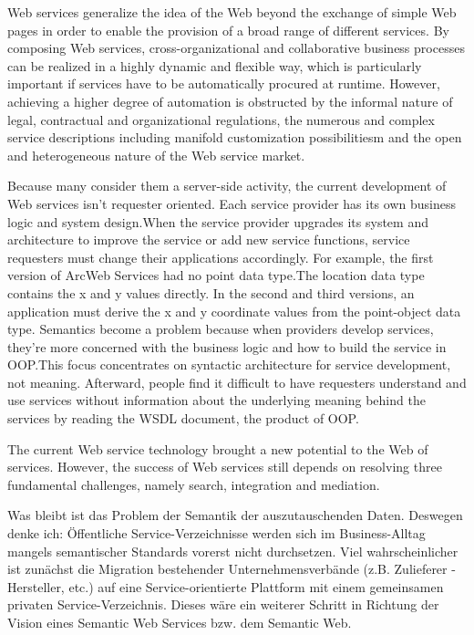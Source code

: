\documentclass[10pt,a4paper]{article}
\begin{document}
Web services generalize the idea of the Web beyond the exchange of simple Web pages in order to enable the provision of a broad range of different services. By composing Web services, cross-organizational and collaborative business processes can be realized in a highly dynamic and flexible way, which is particularly important if services have to be automatically procured at runtime. However, achieving a higher degree of automation is obstructed by the informal nature of legal, contractual and organizational regulations, the numerous and complex service descriptions including manifold customization possibilitiesm and the open and heterogeneous nature of the Web service market.

Because many consider them a server-side activity, the
current development of Web services isn’t requester oriented.
Each service provider has its own business logic and
system design.When the service provider upgrades its system
and architecture to improve the service or add new
service functions, service requesters must change their
applications accordingly. For example, the first version of
ArcWeb Services had no point data type.The location data
type contains the x and y values directly. In the second and
third versions, an application must derive the x and y coordinate
values from the point-object data type. Semantics
become a problem because when providers develop services,
they’re more concerned with the business logic and
how to build the service in OOP.This focus concentrates
on syntactic architecture for service development, not
meaning. Afterward, people find it difficult to have
requesters understand and use services without information
about the underlying meaning behind the services by
reading the WSDL document, the product of OOP. \cite{shi1}

The current Web service technology brought a new potential
to the Web of services. However, the success of Web
services still depends on resolving three fundamental challenges,
namely search, integration and mediation. \cite{WSMOLITE}

Was bleibt ist das Problem der Semantik der auszutauschenden Daten. Deswegen denke ich: Öffentliche Service-Verzeichnisse werden sich im Business-Alltag mangels semantischer Standards vorerst nicht durchsetzen. Viel wahrscheinlicher ist zunächst die Migration bestehender Unternehmensverbände (z.B. Zulieferer - Hersteller, etc.) auf eine Service-orientierte Plattform mit einem gemeinsamen privaten Service-Verzeichnis. Dieses wäre ein weiterer Schritt in Richtung der Vision eines Semantic Web Services bzw. dem Semantic Web.  \cite{hhxmlwssoa} 
\end{document}
